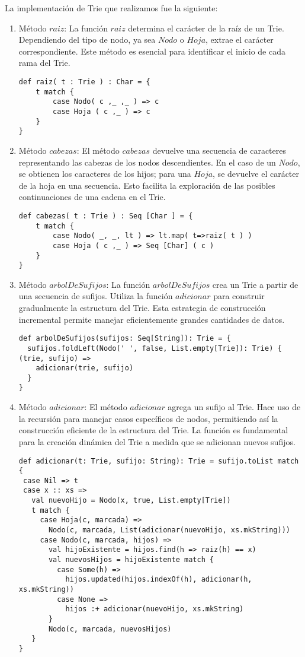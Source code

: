 \documentclass[conference]{IEEEtran}
\begin{document}
La implementación de Trie que realizamos fue la siguiente:
\begin{enumerate}
    \item Método $raiz$:
    La función $raiz$ determina el carácter de la raíz de un Trie. Dependiendo del tipo de nodo, ya sea $Nodo$ o $Hoja$, extrae el carácter correspondiente. Este método es esencial para identificar el inicio de cada rama del Trie.
    \begin{lstlisting}
def raiz( t : Trie ) : Char = {
    t match {
        case Nodo( c ,_ ,_ ) => c
        case Hoja ( c ,_ ) => c
    }
} 
    \end{lstlisting}


    \item Método $cabezas$:
    El método $cabezas$ devuelve una secuencia de caracteres representando las cabezas de los nodos descendientes. En el caso de un $Nodo$, se obtienen los caracteres de los hijos; para una $Hoja$, se devuelve el carácter de la hoja en una secuencia. Esto facilita la exploración de las posibles continuaciones de una cadena en el Trie.
\begin{lstlisting}
def cabezas( t : Trie ) : Seq [Char ] = {
    t match {
        case Nodo( _, _, lt ) => lt.map( t=>raiz( t ) )
        case Hoja ( c ,_ ) => Seq [Char] ( c )
    }
}

\end{lstlisting}
    \item Método $arbolDeSufijos$:
    La función $arbolDeSufijos$ crea un Trie a partir de una secuencia de sufijos. Utiliza la función $adicionar$ para construir gradualmente la estructura del Trie. Esta estrategia de construcción incremental permite manejar eficientemente grandes cantidades de datos.

    \begin{lstlisting}
def arbolDeSufijos(sufijos: Seq[String]): Trie = {
  sufijos.foldLeft(Nodo(' ', false, List.empty[Trie]): Trie) { (trie, sufijo) =>
    adicionar(trie, sufijo)
  }
}

\end{lstlisting}

    \item Método $adicionar$:
    El método $adicionar$ agrega un sufijo al Trie. Hace uso de la recursión para manejar casos específicos de nodos, permitiendo así la construcción eficiente de la estructura del Trie. La función es fundamental para la creación dinámica del Trie a medida que se adicionan nuevos sufijos.

\begin{lstlisting}
def adicionar(t: Trie, sufijo: String): Trie = sufijo.toList match {
 case Nil => t
 case x :: xs =>
   val nuevoHijo = Nodo(x, true, List.empty[Trie])
   t match {
     case Hoja(c, marcada) =>
       Nodo(c, marcada, List(adicionar(nuevoHijo, xs.mkString)))
     case Nodo(c, marcada, hijos) =>
       val hijoExistente = hijos.find(h => raiz(h) == x)
       val nuevosHijos = hijoExistente match {
         case Some(h) =>
           hijos.updated(hijos.indexOf(h), adicionar(h, xs.mkString))
         case None =>
           hijos :+ adicionar(nuevoHijo, xs.mkString)
       }
       Nodo(c, marcada, nuevosHijos)
   }
}


\end{lstlisting}
\end{enumerate}
\end{document}
